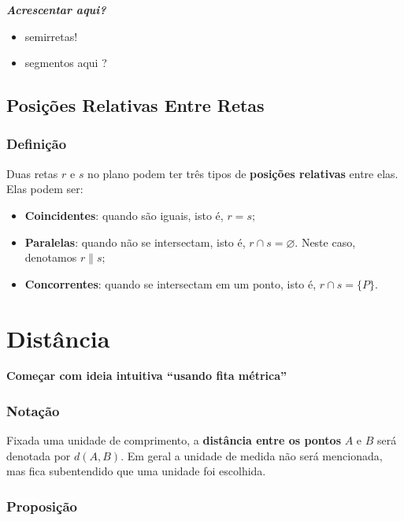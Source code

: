 \documentclass[
  brazilian,
  letterpaper,
  DIV=11,
  numbers=noendperiod]{scrreprt}
\providecommand{\tightlist}{%
  \setlength{\itemsep}{0pt}\setlength{\parskip}{0pt}}
\theoremstyle{definition}
\theoremstyle{plain}
\theoremstyle{definition}
\theoremstyle{remark}
\begin{document}
\textbf{\emph{Acrescentar aqui?}}

\begin{itemize}
\tightlist
\item
  semirretas!
\item
  segmentos aqui ?
\end{itemize}

\section{Posições Relativas Entre
Retas}\label{posiuxe7uxf5es-relativas-entre-retas}

\subsection{Definição}\label{definiuxe7uxe3o}

Duas retas \(r\) e \(s\) no plano podem ter três tipos de
\textbf{posições relativas} entre elas. Elas podem ser:

\begin{itemize}
\tightlist
\item
  \textbf{Coincidentes}: quando são iguais, isto é, \(r=s;\)
\item
  \textbf{Paralelas}: quando não se intersectam, isto é,
  \(r\cap s=\varnothing.\) Neste caso, denotamos \(r\parallel s;\)
\item
  \textbf{Concorrentes}: quando se intersectam em um ponto, isto é,
  \(r\cap s=\{P\}.\)
\end{itemize}


\chapter{Distância}\label{distuxe2ncia}

\textbf{Começar com ideia intuitiva ``usando fita métrica''}

\subsection{Notação}\label{notauxe7uxe3o}

Fixada uma unidade de comprimento, a \textbf{distância entre os pontos}
\(A\) e \(B\) será denotada por \(d(A,B)\). Em geral a unidade de medida
não será mencionada, mas fica subentendido que uma unidade foi
escolhida.

\subsection{Proposição}\label{proposiuxe7uxe3o}
\end{document}

